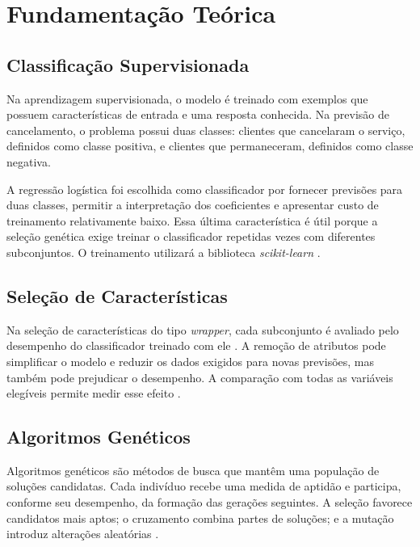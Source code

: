 \documentclass[12pt]{article}
\begin{document}
\section{Fundamentação Teórica}

\subsection{Classificação Supervisionada}

Na aprendizagem supervisionada, o modelo é treinado com exemplos que possuem
características de entrada e uma resposta conhecida. Na previsão de
cancelamento, o problema possui duas classes: clientes que cancelaram o
serviço, definidos como classe positiva, e clientes que permaneceram, definidos
como classe negativa.

A regressão logística foi escolhida como classificador por fornecer previsões
para duas classes, permitir a interpretação dos coeficientes e apresentar custo
de treinamento relativamente baixo. Essa última característica é útil porque
a seleção genética exige treinar o classificador repetidas vezes com diferentes
subconjuntos. O treinamento utilizará a biblioteca \textit{scikit-learn}
\cite{pedregosa2011scikit}.

\subsection{Seleção de Características}

Na seleção de características do tipo \textit{wrapper}, cada subconjunto é
avaliado pelo desempenho do classificador treinado com ele
\cite{kohavi1997wrappers}. A remoção de atributos pode simplificar o modelo e
reduzir os dados exigidos para novas previsões, mas também pode prejudicar o
desempenho. A comparação com todas as variáveis elegíveis permite medir esse
efeito \cite{guyon2003feature}.

\subsection{Algoritmos Genéticos}

Algoritmos genéticos são métodos de busca que mantêm uma população de soluções
candidatas. Cada indivíduo recebe uma medida de aptidão e participa, conforme
seu desempenho, da formação das gerações seguintes. A seleção favorece
candidatos mais aptos; o cruzamento combina partes de soluções; e a mutação
introduz alterações aleatórias \cite{holland1975adaptation}.
\end{document}
